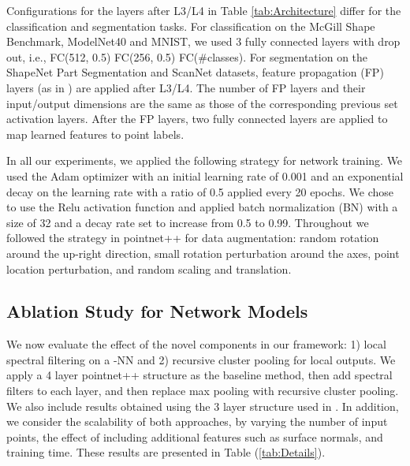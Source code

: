 \documentclass[runningheads]{llncs}
\begin{document}
Configurations for the layers after L3/L4 in Table \ref{tab:Architecture} differ for the classification and segmentation tasks. For classification on the McGill Shape Benchmark, ModelNet40 and MNIST, we used 3 fully connected layers with drop out, i.e., FC(512, 0.5)  FC(256, 0.5)   FC(\#classes). For segmentation on the ShapeNet Part Segmentation and ScanNet datasets, feature propagation (FP) layers (as in \cite{qi2017pointnet}) are applied after L3/L4. The number of FP layers and their input/output dimensions are the same as those of the corresponding previous set activation layers. After the FP layers, two fully connected layers are applied to map learned features to point labels. 

In all our experiments, we applied the following strategy for network training. We used the Adam optimizer \cite{kingma2014adam}
with an initial learning rate of 0.001 and an exponential decay on the learning rate with a ratio of 0.5 applied every 20 epochs. We chose to use the Relu activation function and applied batch normalization (BN) with a size of 32 and a decay rate set to increase from 0.5 to 0.99. Throughout we followed the strategy in pointnet++ \cite{qi2017pointnet} for data augmentation: random rotation around the up-right direction, small rotation perturbation around the  axes, point location perturbation, and random scaling and translation.


\subsection{Ablation Study for Network Models}\label{sec:modelAblation}
We now evaluate the effect of the novel components in our framework: 1) local spectral filtering on a -NN and 2) recursive cluster pooling for local outputs. We apply a 4 layer pointnet++ structure as the baseline method, then add spectral filters to each layer, and then replace max pooling with recursive cluster pooling. We also include results obtained using the 3 layer structure used in \cite{qi2017pointnet}.  In addition, we consider the scalability of both approaches, by varying the number of input points, the effect of including additional features such as surface normals, and training time. These results are presented in Table (\ref{tab:Details}). 
\end{document}
